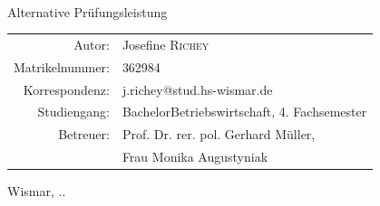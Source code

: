 \documentclass[11pt, a4paper]{article}
\def \aplsemester {4. Fachsemester}
\def \apldoctype {Alternative Prüfungsleistung}
\def \bachmast {Bachelor}
\def \aplbetreuerpri {Prof. Dr. rer. pol. Gerhard Müller}
\def \aplbetreuersec {Frau Monika Augustyniak}
\begin{document}
\begin{titlepage}
{ \huge \bfseries \thetitle}\\ %
\vspace{0.034441853748633004\paperheight}
\large\apldoctype\
\vspace{0.1458980337503154\paperheight}


  \begin{tabular}{rl}
    Autor: & Josefine \textsc{Richey}\\
    Matrikelnummer: & 362984\\
    Korrespondenz: & j.richey@stud.hs-wismar.de\\
    Studiengang: & \bachmast\space Betriebswirtschaft, \aplsemester\\
    Betreuer: & \aplbetreuerpri,\\
     & \aplbetreuersec\\


   \end{tabular} %
   \vspace{0.05572809000084118\paperheight}

{\large {Wismar, \the\day.\the\month.\the\year}}\




\vfill %

\end{titlepage}
\end{document}
